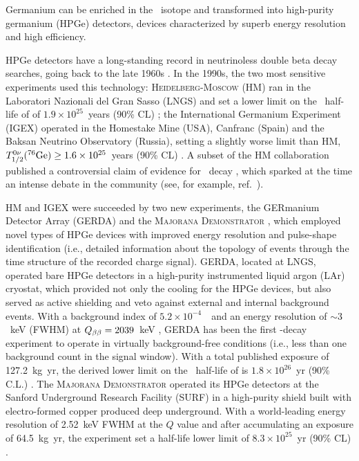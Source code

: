 %
Germanium can be enriched in the \bb\ isotope and transformed into high-purity germanium (HPGe) detectors, devices characterized by superb energy resolution and high efficiency. 

HPGe detectors have a long-standing record in neutrinoless double beta decay searches, going back to the late 1960s \cite{Fiorini:1967in,Fiorini:1970}. In the 1990s, the two most sensitive experiments used this technology: \textsc{Heidelberg-Moscow} (HM) ran in the Laboratori Nazionali del Gran Sasso (LNGS) and set a lower limit on the \bbonu\ half-life of  of $1.9 \times 10^{25}$~years (90\% CL) \cite{Klapdor-Kleingrothaus:2000eir}; the International Germanium Experiment (IGEX) operated in the Homestake Mine (USA), Canfranc (Spain) and the Baksan Neutrino Observatory (Russia), setting a slightly worse limit than HM, $T^{0\nu}_{1/2}(^{76}\mathrm{Ge}) \geq 1.6 \times 10^{25}$~years (90\% CL) \cite{IGEX:2002bce}. A subset of the HM collaboration published a controversial claim of evidence for \bbonu\ decay \cite{Klapdor-Kleingrothaus:2001oba, Klapdor-Kleingrothaus:2006zcr}, which sparked at the time an intense debate in the community (see, for example, ref.~\cite{Aalseth:2002dt}). 

HM and IGEX were succeeded by two new experiments, the GERmanium Detector Array (GERDA) \cite{GERDA:2020xhi} and the \textsc{Majorana Demonstrator} \cite{Majorana:2022udl}, which employed novel types of HPGe devices with improved energy resolution and pulse-shape identification (i.e., detailed information about the topology of events through the time structure of the recorded charge signal). GERDA, located at LNGS, operated bare HPGe detectors in a high-purity instrumented liquid argon (LAr) cryostat, which provided not only the cooling for the HPGe devices, but also served as active shielding and veto against external and internal background events. With a background index of $5.2\times10^{-4}$~\ckky\ and an energy resolution of $\sim3$~keV (FWHM) at $Q_{\beta\beta}=2039$~keV \cite{GERDA:2020xhi}, GERDA has been the first \bbonu-decay experiment to operate in virtually background-free conditions (i.e., less than one background count in the signal window). With a total published exposure of 127.2~kg~yr, the derived lower limit on the \bbonu\ half-life of  is $1.8\times10^{26}$~yr (90\% C.L.) \cite{GERDA:2020xhi}. The \textsc{Majorana Demonstrator} operated its HPGe detectors at the Sanford Underground Research Facility (SURF) in a high-purity shield built with electro-formed copper produced deep underground. With a world-leading energy resolution of 2.52~keV FWHM at the $Q$ value and after accumulating an exposure of 64.5~kg~yr, the experiment set a half-life lower limit of $8.3\times10^{25}$~yr (90\% CL) \cite{Majorana:2022udl}.

